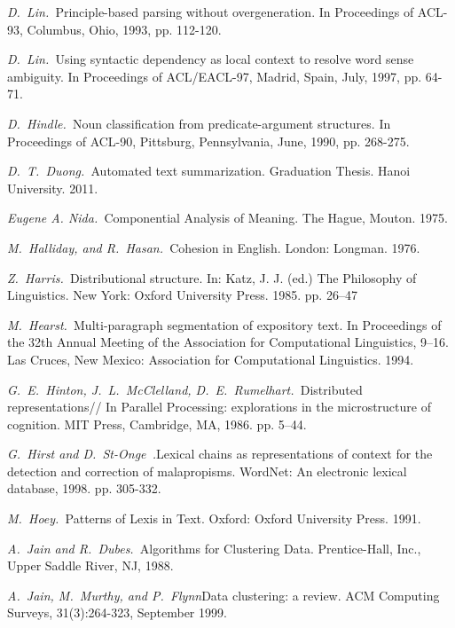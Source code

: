 \documentclass{article}
\begin{document}
\begin{articletext}
\begin{thebibliography}{9}
\textit{D.~Lin.~}Principle-based parsing without overgeneration. In Proceedings of ACL-93, Columbus, Ohio, 1993, pp. 112-120.

\textit{D.~Lin.~}Using syntactic dependency as local context to resolve word sense ambiguity. In Proceedings of ACL/EACL-97, Madrid, Spain, July, 1997, pp. 64-71.

\textit{D.~Hindle.~}Noun classification from predicate-argument structures. In Proceedings of ACL-90, Pittsburg, Pennsylvania, June, 1990, pp. 268-275.

\textit{D.~T.~Duong.~}Automated text summarization. Graduation Thesis. Hanoi University. 2011. 

\textit{Eugene A. Nida.~}Componential Analysis of Meaning. The Hague, Mouton. 1975. 

\textit{M.~Halliday, and R.~Hasan.~}Cohesion in English. London: Longman. 1976. 

\textit{Z.~Harris.~}Distributional structure. In: Katz, J. J. (ed.) The Philosophy of Linguistics. New York: Oxford University Press. 1985. pp. 26–47

\textit{M.~Hearst.~}Multi-paragraph segmentation of expository text. In Proceedings of the 32th Annual Meeting of the Association for Computational Linguistics, 9–16. Las Cruces, New Mexico: Association for Computational Linguistics. 1994. 

\textit{G.~E.~Hinton, J.~L.~McClelland, D.~E.~Rumelhart.~}Distributed representations// In Parallel Processing: explorations in the microstructure of cognition. MIT Press, Cambridge, MA, 1986. pp. 5–44.

\textit{G.~Hirst and D.~St-Onge~.}Lexical chains as representations of context for the detection and correction of malapropisms. WordNet: An electronic lexical database, 1998. pp. 305-332.

\textit{M.~Hoey.~}Patterns of Lexis in Text. Oxford: Oxford University Press. 1991. 

\textit{A.~Jain and R.~Dubes.~}Algorithms for Clustering Data. Prentice-Hall, Inc., Upper Saddle River, NJ, 1988.

\textit{A.~Jain, M.~Murthy, and P.~Flynn}Data clustering: a review. ACM Computing Surveys, 31(3):264-323, September 1999.


\end{thebibliography}
\end{articletext}
\end{document}

